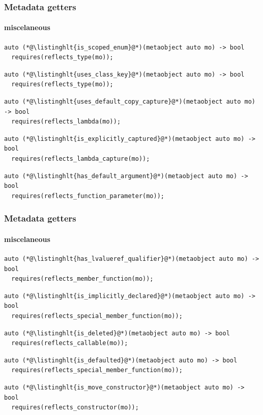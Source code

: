 \documentclass[aspectratio=169,compress,table,xcolor=table]{beamer}
\begin{document}
\begin{frame}[fragile]
  \frametitle{Metadata getters}
  \framesubtitle{miscelaneous}
  \begin{lstlisting}[language=c++2x,basicstyle=\footnotesize\ttfamily]
auto (*@\listinghlt{is_scoped_enum}@*)(metaobject auto mo) -> bool
  requires(reflects_type(mo));
  \end{lstlisting}
  \vfill
  \begin{lstlisting}[language=c++2x,basicstyle=\footnotesize\ttfamily]
auto (*@\listinghlt{uses_class_key}@*)(metaobject auto mo) -> bool
  requires(reflects_type(mo));
  \end{lstlisting}
  \vfill
  \begin{lstlisting}[language=c++2x,basicstyle=\footnotesize\ttfamily]
auto (*@\listinghlt{uses_default_copy_capture}@*)(metaobject auto mo) -> bool
  requires(reflects_lambda(mo));
  \end{lstlisting}
  \vfill
  \begin{lstlisting}[language=c++2x,basicstyle=\footnotesize\ttfamily]
auto (*@\listinghlt{is_explicitly_captured}@*)(metaobject auto mo) -> bool
  requires(reflects_lambda_capture(mo));
  \end{lstlisting}
  \vfill
  \begin{lstlisting}[language=c++2x,basicstyle=\footnotesize\ttfamily]
auto (*@\listinghlt{has_default_argument}@*)(metaobject auto mo) -> bool
  requires(reflects_function_parameter(mo));
  \end{lstlisting}
\end{frame}
\begin{frame}[fragile]
  \frametitle{Metadata getters}
  \framesubtitle{miscelaneous}
  \begin{lstlisting}[language=c++2x,basicstyle=\scriptsize\ttfamily]
auto (*@\listinghlt{has_lvalueref_qualifier}@*)(metaobject auto mo) -> bool
  requires(reflects_member_function(mo));
  \end{lstlisting}
  \vfill
  \begin{lstlisting}[language=c++2x,basicstyle=\footnotesize\ttfamily]
auto (*@\listinghlt{is_implicitly_declared}@*)(metaobject auto mo) -> bool
  requires(reflects_special_member_function(mo));
  \end{lstlisting}
  \vfill
  \begin{lstlisting}[language=c++2x,basicstyle=\footnotesize\ttfamily]
auto (*@\listinghlt{is_deleted}@*)(metaobject auto mo) -> bool
  requires(reflects_callable(mo));
  \end{lstlisting}
  \vfill
  \begin{lstlisting}[language=c++2x,basicstyle=\footnotesize\ttfamily]
auto (*@\listinghlt{is_defaulted}@*)(metaobject auto mo) -> bool
  requires(reflects_special_member_function(mo));
  \end{lstlisting}
  \vfill
  \begin{lstlisting}[language=c++2x,basicstyle=\footnotesize\ttfamily]
auto (*@\listinghlt{is_move_constructor}@*)(metaobject auto mo) -> bool
  requires(reflects_constructor(mo));
  \end{lstlisting}
\end{frame}
\end{document}
